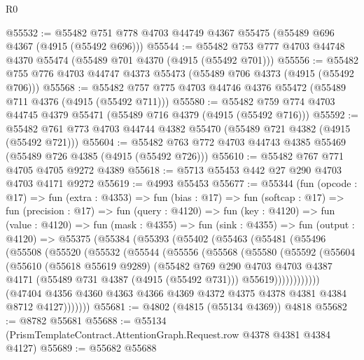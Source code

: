 \begin{lexlean}{R0}
\begin{coremodule}
@55532 := @55482 @751 @778 @4703 @44749 @4367 @55475 (@55489 @696 @4367 (@4915 (@55492 @696)))
@55544 := @55482 @753 @777 @4703 @44748 @4370 @55474 (@55489 @701 @4370 (@4915 (@55492 @701)))
@55556 := @55482 @755 @776 @4703 @44747 @4373 @55473 (@55489 @706 @4373 (@4915 (@55492 @706)))
@55568 := @55482 @757 @775 @4703 @44746 @4376 @55472 (@55489 @711 @4376 (@4915 (@55492 @711)))
@55580 := @55482 @759 @774 @4703 @44745 @4379 @55471 (@55489 @716 @4379 (@4915 (@55492 @716)))
@55592 := @55482 @761 @773 @4703 @44744 @4382 @55470 (@55489 @721 @4382 (@4915 (@55492 @721)))
@55604 := @55482 @763 @772 @4703 @44743 @4385 @55469 (@55489 @726 @4385 (@4915 (@55492 @726)))
@55610 := @55482 @767 @771 @4705 @4705 @9272 @4389
@55618 := @5713 @55453 @442 @27 @290 @4703 @4703 @4171 @9272
@55619 := @4993 @55453
@55677 := @55344
    (fun (opcode : @17) =>
    fun (extra : @4353) =>
    fun (bias : @17) =>
    fun (softcap : @17) =>
    fun (precision : @17) =>
    fun (query : @4120) =>
    fun (key : @4120) =>
    fun (value : @4120) =>
    fun (mask : @4355) =>
    fun (sink : @4355) =>
    fun (output : @4120) =>
    @55375
      (@55384
        (@55393
          (@55402
            (@55463
              (@55481
                (@55496
                  (@55508
                    (@55520
                      (@55532
                        (@55544
                          (@55556
                            (@55568
                              (@55580
                                (@55592
                                  (@55604
                                    (@55610
                                      (@55618 @55619 @9289)
                                      (@55482
                                        @769
                                        @290
                                        @4703
                                        @4703
                                        @4387
                                        @4171
                                        (@55489 @731 @4387 (@4915 (@55492 @731)))
                                        @55619))))))))))))
                (@47404
                  @4356
                  @4360
                  @4363
                  @4366
                  @4369
                  @4372
                  @4375
                  @4378
                  @4381
                  @4384
                  @8712
                  @4127)))))))
@55681 := @4802 (@4815 (@55134 @4369)) @4818
@55682 := @8782 @55681
@55688 := @55134 (PrismTemplateContract.AttentionGraph.Request.row @4378 @4381 @4384 @4127)
@55689 := @55682 @55688

\end{coremodule}
\end{lexlean}
